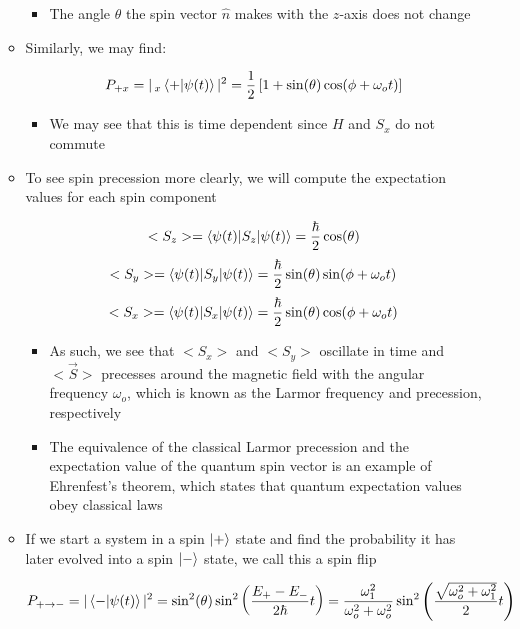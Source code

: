 \begin{itemize}
\begin{itemize}
\begin{itemize}
          \item The angle $\theta$ the spin vector $\hat{n}$ makes with the $z$-axis does not change

        \end{itemize}

      \item Similarly, we may find:

        $$P_{+x}=|\,_x\bra{+}\ket{\psi(t)}|^2=\frac{1}{2}\left[ 1+\sin(\theta)\cos(\phi+\omega_o t) \right]$$

        \begin{itemize}

          \item We may see that this is time dependent since $H$ and $S_x$ do not commute

        \end{itemize}

      \item To see spin precession more clearly, we will compute the expectation values for each spin component

        $$<S_z>=\bra{\psi(t)|S_z}\ket{\psi(t)}=\frac{\hbar}{2}\cos(\theta)$$
        $$<S_y>=\bra{\psi(t)|S_y}\ket{\psi(t)}=\frac{\hbar}{2}\sin(\theta)\sin(\phi+\omega_o t)$$
        $$<S_x>=\bra{\psi(t)|S_x}\ket{\psi(t)}=\frac{\hbar}{2}\sin(\theta)\cos(\phi+\omega_o t)$$

        \begin{itemize}

          \item As such, we see that $<S_x>$ and $<S_y>$ oscillate in time and $<\vec{S}>$ precesses around the magnetic field with the angular frequency $\omega_o$, which is known as the Larmor frequency and precession, respectively

          \item The equivalence of the classical Larmor precession and the expectation value of the quantum spin vector is an example of Ehrenfest's theorem, which states that quantum expectation values obey classical laws

        \end{itemize}

      \item If we start a system in a spin $\ket{+}$ state and find the probability it has later evolved into a spin $\ket{-}$ state, we call this a spin flip

        $$P_{+\to-}=|\bra{-}\ket{\psi(t)}|^2=\sin^2(\theta)\sin^2\left( \frac{E_+-E_-}{2\hbar}t \right)=\frac{\omega_1^2}{\omega_o^2+\omega_o^2}\sin^2\left( \frac{\sqrt{\omega_o^2+\omega_1^2}}{2}t \right)$$


\end{itemize}
\end{itemize}
